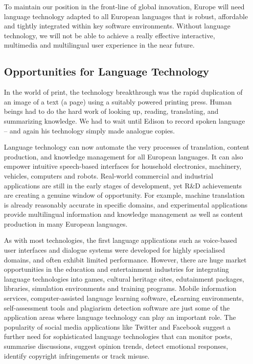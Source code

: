 \begin{multicols}{2}

    To maintain our position in the front-line of global innovation, Europe will need language technology adapted to all European languages that is robust, affordable and tightly integrated within key software environments. Without language technology, we will not be able to achieve a really effective interactive, multimedia and multilingual user experience in the near future.

\subsection{Opportunities for Language Technology}


    In the world of print, the technology breakthrough was the rapid duplication of an image of a text (a page) using a suitably powered printing press. Human beings had to do the hard work of looking up, reading, translating, and summarizing knowledge. We had to wait until Edison to record spoken language – and again his technology simply made analogue copies.

    Language technology can now automate the very processes of translation, content production, and knowledge management for all European languages. It can also empower intuitive speech-based interfaces for household electronics, machinery, vehicles, computers and robots. Real-world commercial and industrial applications are still in the early stages of development, yet R\&D achievements are creating a genuine window of opportunity. For example, machine translation is already reasonably accurate in specific domains, and experimental applications provide multilingual information and knowledge management as well as content production in many European languages. 

    As with most technologies, the first language applications such as voice-based user interfaces and dialogue systems were developed for highly specialised domains, and often exhibit limited performance. However, there are huge market opportunities in the education and entertainment industries for integrating language technologies into games, cultural heritage sites, edutainment packages, libraries, simulation environments and training programs. Mobile information services, computer-assisted language learning software, eLearning environments, self-assessment tools and plagiarism detection software are just some of the application areas where language technology can play an important role. The popularity of social media applications like Twitter and Facebook suggest a further need for sophisticated language technologies that can monitor posts, summarise discussions, suggest opinion trends, detect emotional responses, identify copyright infringements or track misuse.


\end{multicols}

